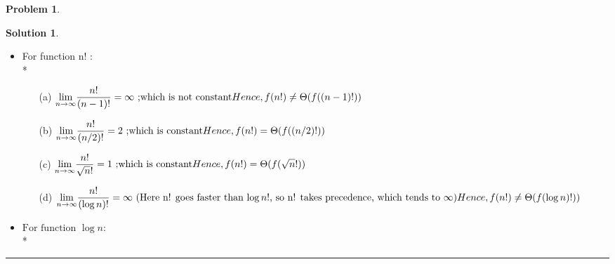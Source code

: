 \documentclass{article}
\theoremstyle{definition}
\newtheorem{problem}{Problem}
\def\fline{\rule{0.75\linewidth}{0.5pt}}
\newcommand{\finishline}{\begin{center}\fline\end{center}}
\newtheorem*{solution*}{Solution}
\newenvironment{solution}{\begin{solution*}}{{\finishline} \end{solution*}}
\begin{document}
\begin{problem}
\begin{enumerate}
\begin{solution}
\begin{itemize}
			\item For function n! : \\*
			\begin{enumerate}
				 \item[(a)] $\displaystyle{\lim_{n \to \infty}} \frac {n!}{(n-1)!} = \infty {\text{ ;which is not constant}} \bigskip\\*
				 Hence, f(n!) \neq \Theta(f((n-1)!))$
				\item[(b)] $\displaystyle{\lim_{n \to \infty}} \frac {n!}{(n/2)!} = 2 {\text{ ;which is constant}} \bigskip\\*
				 Hence, f(n!) = \Theta(f((n/2)!))$
				\item[(c)] $\displaystyle{\lim_{n \to \infty}} \frac {n!}{\sqrt n!} = 1 {\text{ ;which is constant}} \bigskip\\*
				 Hence, f(n!) = \Theta(f(\sqrt n!))$
				\item[(d)] $\displaystyle{\lim_{n \to \infty}} \frac {n!}{(\log n)!} = \infty {\text{ (Here n! goes faster than $\log n!$, so n! takes precedence, which tends to $\infty$)}} \bigskip\\*
				 Hence, f(n!) \neq \Theta(f(\log n)!))$
		          \end{enumerate}
			\item ${\text{For function }} \log n:$\\*
\end{itemize}
\end{solution}
\end{enumerate}
\end{problem}
\end{document}
